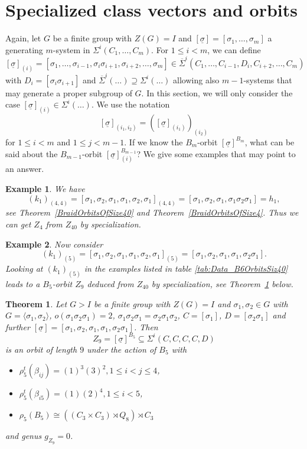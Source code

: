 \documentclass[12pt,a4paper]{article}
\newtheorem{theorem}{Theorem}[section]
\newtheorem{example}{Example}[section]
\numberwithin{equation}{section}
\numberwithin{table}{section}
\begin{document}
\section{Specialized class vectors and orbits}\label{SectionDerivedClassvectors}

Again, let $G$ be a finite group with $Z(G)=I$ and $[\underline{\sigma}] = [\sigma_1, \dots, \sigma_m]$
a generating $m$-system in $\Sigma^i(C_1,\dots, C_m)$.
For $1 \leq i < m$, we can define
$$[\underline{\sigma}]_{(i)} = [\sigma_1, \dots, \sigma_{i-1}, \sigma_i \sigma_{i+1}, \sigma_{i+2}, \dots, \sigma_m] \in 
{\overline\Sigma}^i(C_1,\dots, C_{i-1}, D_i,  C_{i+2}, \dots, C_m)$$
with $D_i = [\sigma_i \sigma_{i+1}]$ and ${\overline\Sigma}^i(\dots) \supseteq {\Sigma}^i(\dots)$
allowing also $m-1$-systems that may generate a proper subgroup of $G$.
In this section, we will only consider the case $[\underline{\sigma}]_{(i)} \in \Sigma^i(\dots)$.
We use the notation
$$[\underline{\sigma}]_{(i_1,i_2)} = ([\underline{\sigma}]_{(i_1)})_{(i_2)}$$
for $1 \leq i < m$ and $1 \leq j < m-1$.
If we know the $B_m$-orbit $[\underline{\sigma}]^{B_m}$, what can be said about the $B_{m-1}$-orbit
$[\underline{\sigma}]_{(i)}^{B_{m-1}}$? We give some examples that may point to an answer.
%
\begin{example}
\label{FromZ40ToZ4}
We have 
$$(k_1)_{(4,4)} = [\sigma_1,\sigma_2,\sigma_1,\sigma_1,\sigma_2,\sigma_1]_{(4,4)} = [\sigma_1,\sigma_2,\sigma_1,\sigma_1\sigma_2\sigma_1] = h_1,$$
see Theorem~\ref{BraidOrbitsOfSize40} and Theorem~\ref{BraidOrbitsOfSize4}. Thus we can get $Z_4$ from $Z_{40}$
by specialization.
\end{example}
%
\begin{example}
\label{FromZ40ToZ9}
Now consider
$$(k_1)_{(5)} = [\sigma_1,\sigma_2,\sigma_1,\sigma_1,\sigma_2,\sigma_1]_{(5)} = [\sigma_1,\sigma_2,\sigma_1,\sigma_1,\sigma_2\sigma_1].$$
Looking at $(k_1)_{(5)}$ in the examples listed in table \ref{tab:Data_B6OrbitsSiz40} leads to a $B_5$-orbit $Z_9$
deduced from $Z_{40}$ by specialization, see Theorem~\ref{BraidOrbitsOfSize9} below.
\end{example}
%
\begin{theorem}
\label{BraidOrbitsOfSize9}
Let $G>I$ be a finite group with $Z(G)=I$ and $\sigma_1, \sigma_2 \in G$ with
$G=\langle \sigma_1, \sigma_2 \rangle$, $o(\sigma_1 \sigma_2 \sigma_1 )=2$,
$\sigma_1 \sigma_2 \sigma_1 = \sigma_2 \sigma_1 \sigma_2$, $C = [\sigma_1]$, $D = [\sigma_2\sigma_1]$ and further
$[\underline{\sigma}] = [\sigma_1, \sigma_2, \sigma_1, \sigma_1, \sigma_2\sigma_1]$.
Then
$$Z_9 = [\underline{\sigma}]^{B_5} \subseteq \Sigma^i(C,C,C,C,D)$$
is an orbit of length $9$ under the action of $B_5$ with
\begin{itemize}
\item[]
$\rho^t_5(\beta_{ij}) = (1)^3(3)^2, 1 \leq i < j \leq 4$,
\item[]
$\rho^t_5(\beta_{i5}) = (1)(2)^4, 1 \leq i < 5$,
\item[]
$\rho_5(B_5) \cong ((C_3 \times C_3) \rtimes Q_8) \rtimes C_3$
\end{itemize}
and genus $g_{Z_9}=0$.
\end{theorem}
\end{document}
